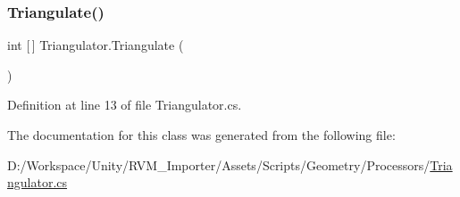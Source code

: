 \subsubsection{\texorpdfstring{Triangulate()}{Triangulate()}}
{\footnotesize\ttfamily int \mbox{[}$\,$\mbox{]} Triangulator.\+Triangulate (\begin{DoxyParamCaption}{ }\end{DoxyParamCaption})}



Definition at line 13 of file Triangulator.\+cs.



The documentation for this class was generated from the following file\+:\begin{DoxyCompactItemize}
\item 
D\+:/\+Workspace/\+Unity/\+R\+V\+M\+\_\+\+Importer/\+Assets/\+Scripts/\+Geometry/\+Processors/\mbox{\hyperlink{_triangulator_8cs}{Triangulator.\+cs}}\end{DoxyCompactItemize}

